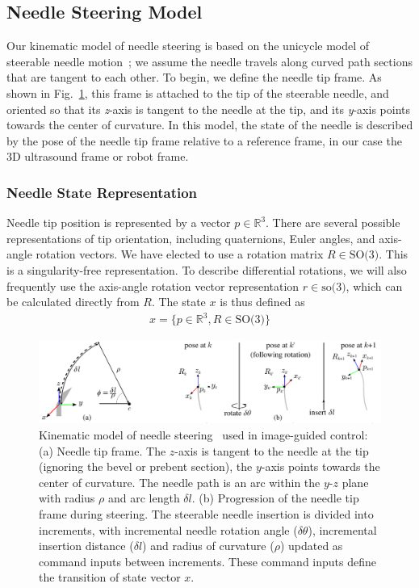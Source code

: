 \subsection{Needle Steering Model}
Our kinematic model of needle steering is based on the unicycle model of steerable needle motion~\cite{Park2005,Webster2006}; we assume the needle travels along curved path sections that are tangent to each other. To begin, we define the needle tip frame. As shown in Fig.~\ref{fig:NeedleKinematics}, this frame is attached to the tip of the steerable needle, and oriented so that its \textit{z}-axis is tangent to the needle at the tip, and its \textit{y}-axis points towards the center of curvature. In this model, the state of the needle is described by the pose of the needle tip frame relative to a reference frame, in our case the 3D ultrasound frame or robot frame. 

\subsubsection{Needle State Representation}
Needle tip position is represented by a vector ${p} \in \mathbb{R}^3$. There are several possible representations of tip orientation, including quaternions, Euler angles, and axis-angle rotation vectors. We have elected to use a rotation matrix ${R} \in \textrm{SO(3)}$. This is a singularity-free representation. To describe differential rotations, we will also frequently use the axis-angle rotation vector representation $r \in \textrm{so(3)}$, which can be calculated directly from ${R}$. The state ${x}$ is thus defined as
\begin{align}
{x} = \{p \in \mathbb{R}^3, R \in \textrm{SO(3)}\}
\end{align}

\begin{figure}[!t]
\centering
\includegraphics[width=\textwidth]{Images/Chapter4/NeedleKinematics/NeedleKinematics}%
\caption[Kinematic model of needle steering]{Kinematic model of needle steering~\cite{Webster2006} used in image-guided control: (a) Needle tip frame. The $z$-axis is tangent to the needle at the tip (ignoring the bevel or prebent section), the $y$-axis points towards the center of curvature. The needle path is an arc within the $y$-$z$ plane with radius $\rho$ and arc length $\delta l$. (b) Progression of the needle tip frame during steering. The steerable needle insertion is divided into increments, with incremental needle rotation angle ($\delta\theta$), incremental insertion distance ($\delta l$) and radius of curvature ($\rho$) updated as command inputs between increments. These command inputs define the transition of state vector ${x}$.}
\label{fig:NeedleKinematics}
\end{figure}

